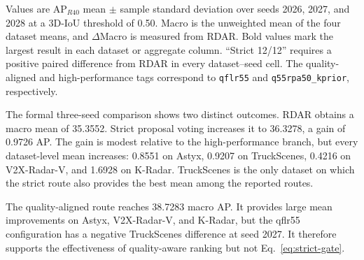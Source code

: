 \documentclass[preprint,12pt,times]{elsarticle}
\newcommand{\reviewcaption}[1]{\caption{\textcolor{floatreviewblue}{#1}}}
\newcommand{\reviewcaption}[1]{\caption{#1}}
\begin{document}
\begin{table}[!t]
\centering
\reviewcaption{Main three-seed comparison of RDAR and the quality-aligned,
high-performance, and strict routes.}
\label{tab:main-results}
\begingroup
\color{black}
\scriptsize
\setlength{\tabcolsep}{5pt}
\renewcommand{\arraystretch}{1.20}
\endgroup
\vspace{2pt}
\parbox{\textwidth}{\scriptsize
Values are AP$_{R40}$ mean $\pm$ sample standard deviation over seeds 2026,
2027, and 2028 at a 3D-IoU threshold of 0.50. Macro is the unweighted mean of
the four dataset means, and $\Delta$Macro is measured from RDAR. Bold values
mark the largest result in each dataset or aggregate column. ``Strict 12/12''
requires a positive paired difference from RDAR in every dataset--seed cell.
The quality-aligned and high-performance tags correspond to
\texttt{qflr55} and \texttt{q55rpa50\_kprior}, respectively.}
\end{table}

The formal three-seed comparison shows two distinct outcomes. RDAR obtains a macro mean of
35.3552. Strict proposal voting increases it to 36.3278, a gain of 0.9726 AP.
The gain is modest relative to the high-performance branch, but every
dataset-level mean increases: 0.8551 on Astyx, 0.9207 on TruckScenes, 0.4216
on V2X-Radar-V, and 1.6928 on K-Radar. TruckScenes is the only dataset on
which the strict route also provides the best mean among the reported routes.

The quality-aligned route reaches 38.7283 macro AP. It provides large mean
improvements on Astyx, V2X-Radar-V, and K-Radar, but the qflr55 configuration
has a negative TruckScenes difference at seed 2027. It therefore supports the
effectiveness of quality-aware ranking but not Eq.~\eqref{eq:strict-gate}.
\end{document}
